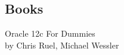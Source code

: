 
\setcounter{secnumdepth}{0}
\subsection{Books}

Oracle 12c For Dummies\\
by Chris Ruel, Michael Wessler


